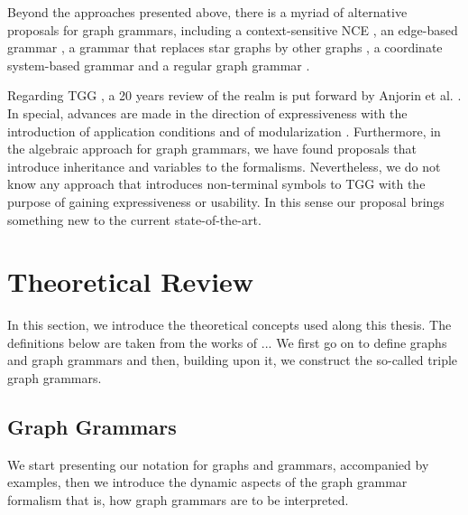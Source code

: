 \documentclass[]{report}
\begin{document}
Beyond the approaches presented above, there is a myriad of alternative proposals for graph grammars, including a context-sensitive NCE \cite{adachi1999nce}, an edge-based grammar \cite{shi2015method}, a grammar that replaces star graphs by other graphs \cite{drewes2010adaptive}, a coordinate system-based grammar \cite{kong2006spatial} and a regular graph grammar \cite{gilroy2017parsing}.

Regarding TGG \cite{schurr1994specification}, a 20 years review of the realm is put forward by Anjorin et al. \cite{anjorin201620}. In special, advances are made in the direction of expressiveness with the introduction of application conditions \cite{klar2010extended} and of modularization \cite{anjorin2014modularizing}. Furthermore, in the algebraic approach for graph grammars, we have found proposals that introduce inheritance \cite{bardohl2004integrating,hermann2008typed} and variables \cite{hoffmann2005graph} to the formalisms. Nevertheless, we do not know any approach that introduces non-terminal symbols to TGG with the purpose of gaining expressiveness or usability. In this sense our proposal brings something new to the current state-of-the-art.


\section{Theoretical Review}
In this section, we introduce the theoretical concepts used along this thesis. The definitions below are taken from the works of ...%
We first go on to define graphs and graph grammars and then, building upon it, we construct the so-called triple graph grammars.


\subsection{Graph Grammars}
We start presenting our notation for graphs and grammars, accompanied by examples, then we introduce the dynamic aspects of the graph grammar formalism that is, how graph grammars are to be interpreted.
\end{document}
